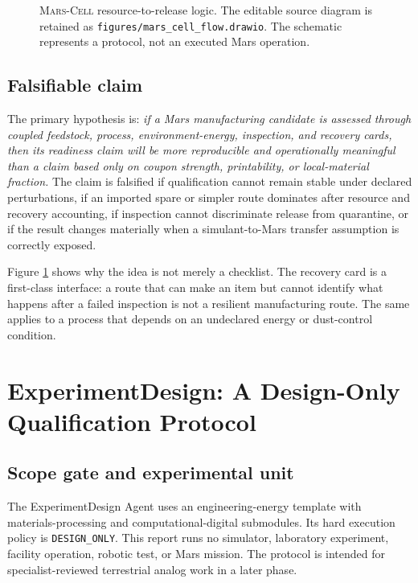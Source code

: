 \documentclass[conference]{../../../../Conference-LaTeX-template_10-17-19/IEEEtran}
\newcommand{\marscell}{\textsc{Mars-Cell}}
\begin{document}
\begin{figure}[!t]
\centering
{}
\caption{\marscell{} resource-to-release logic. The editable source diagram is retained as \texttt{figures/mars\_cell\_flow.drawio}. The schematic represents a protocol, not an executed Mars operation.}
\label{fig:marscell}
\end{figure}

\subsection{Falsifiable claim}
The primary hypothesis is: \emph{if a Mars manufacturing candidate is assessed through coupled feedstock, process, environment-energy, inspection, and recovery cards, then its readiness claim will be more reproducible and operationally meaningful than a claim based only on coupon strength, printability, or local-material fraction.} The claim is falsified if qualification cannot remain stable under declared perturbations, if an imported spare or simpler route dominates after resource and recovery accounting, if inspection cannot discriminate release from quarantine, or if the result changes materially when a simulant-to-Mars transfer assumption is correctly exposed.

Figure \ref{fig:marscell} shows why the idea is not merely a checklist. The recovery card is a first-class interface: a route that can make an item but cannot identify what happens after a failed inspection is not a resilient manufacturing route. The same applies to a process that depends on an undeclared energy or dust-control condition.

\section{ExperimentDesign: A Design-Only Qualification Protocol}
\subsection{Scope gate and experimental unit}
The ExperimentDesign Agent uses an engineering-energy template with materials-processing and computational-digital submodules. Its hard execution policy is \texttt{DESIGN\_ONLY}. This report runs no simulator, laboratory experiment, facility operation, robotic test, or Mars mission. The protocol is intended for specialist-reviewed terrestrial analog work in a later phase.
\end{document}
